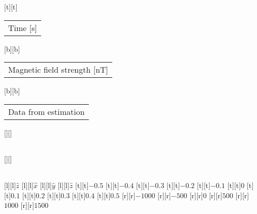 %
[t][t]{\fontsize{8}{12}\selectfont \setlength{\tabcolsep}{0pt}\begin{tabular}{c}Time [s]\end{tabular}}%
[b][b]{\fontsize{8}{12}\selectfont \setlength{\tabcolsep}{0pt}\begin{tabular}{c}Magnetic field strength [nT]\end{tabular}}%
[b][b]{\fontsize{8}{12}\selectfont \setlength{\tabcolsep}{0pt}\begin{tabular}{c}Data from estimation\end{tabular}}%
[][]{\fontsize{8}{12}\selectfont \setlength{\tabcolsep}{0pt}\begin{tabular}{c} \end{tabular}}%
[][]{\fontsize{8}{12}\selectfont \setlength{\tabcolsep}{0pt}\begin{tabular}{c} \end{tabular}}%
[l][l]{\fontsize{6}{8}\selectfont $\hat{z}$}%
[l][l]{\fontsize{6}{8}\selectfont $\hat{x}$}%
[l][l]{\fontsize{6}{8}\selectfont $\hat{y}$}%
[l][l]{\fontsize{6}{8}\selectfont $\hat{z}$}%
%
\fontsize{6}{8}%
\selectfont%
%
[t][t]{$-0.5$}%
[t][t]{$-0.4$}%
[t][t]{$-0.3$}%
[t][t]{$-0.2$}%
[t][t]{$-0.1$}%
[t][t]{$0$}%
[t][t]{$0.1$}%
[t][t]{$0.2$}%
[t][t]{$0.3$}%
[t][t]{$0.4$}%
[t][t]{$0.5$}%
%
[r][r]{$-1000$}%
[r][r]{$-500$}%
[r][r]{$0$}%
[r][r]{$500$}%
[r][r]{$1000$}%
[r][r]{$1500$}%
%
%
